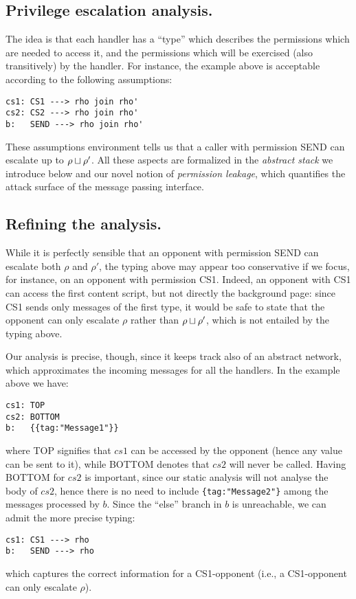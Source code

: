 \subsection{Privilege escalation analysis.}
The idea is that each handler has a ``type'' which describes the permissions which are needed to access it, and the permissions which will be exercised (also transitively) by the handler. For instance, the example above is acceptable according to the following assumptions:
\begin{verbatim}
cs1: CS1 ---> rho join rho'
cs2: CS2 ---> rho join rho'
b:   SEND ---> rho join rho'
\end{verbatim}
These assumptions environment tells us that a caller with permission SEND can escalate up to $\rho \sqcup \rho'$. All these aspects are formalized in the \emph{abstract stack} we introduce below and our novel notion of \emph{permission leakage}, which quantifies the attack surface of the message passing interface.

\subsection{Refining the analysis.}
While it is perfectly sensible that an opponent with permission SEND can escalate both $\rho$ and $\rho'$, the typing above may appear too conservative if we focus, for instance, on an opponent with permission CS1. Indeed, an opponent with CS1 can access the first content script, but not directly the background page: since CS1 sends only messages of the first type, it would be safe to state that the opponent can only escalate $\rho$ rather than $\rho \sqcup \rho'$, which is not entailed by the typing above.

Our analysis is precise, though, since it keeps track also of an abstract network, which approximates the incoming messages for all the handlers. In the example above we have:
\begin{verbatim}
cs1: TOP
cs2: BOTTOM
b:   {{tag:"Message1"}}
\end{verbatim}
where TOP signifies that $cs1$ can be accessed by the opponent (hence any value can be sent to it), while BOTTOM denotes that $cs2$ will never be called. Having BOTTOM for $cs2$ is important, since our static analysis will not analyse the body of $cs2$, hence there is no need to include \texttt{\{tag:"Message2"\}} among the messages processed by $b$. Since the ``else'' branch in $b$ is unreachable, we can admit the more precise typing:
\begin{verbatim}
cs1: CS1 ---> rho
b:   SEND ---> rho
\end{verbatim}
which captures the correct information for a CS1-opponent (i.e., a CS1-opponent can only escalate $\rho$).

